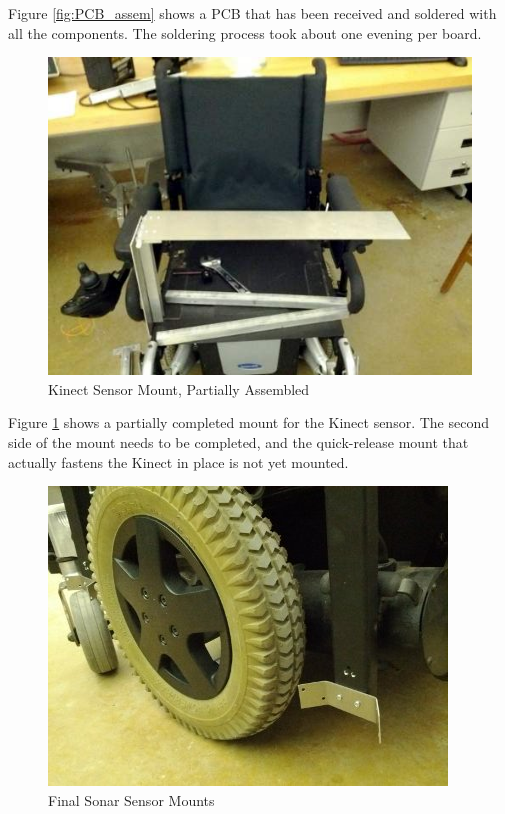 \documentclass[oneside,final,a4paper]{report}
\begin{document}
Figure \ref{fig:PCB_assem} shows a PCB that has been received and soldered with all the components. The soldering process took about one evening per board.

\begin{figure}[hbt]
 \centering
 \includegraphics[scale=0.35]{Kinect_Shelf}
 \caption{Kinect Sensor Mount, Partially Assembled}
 \label{fig:kinect_partial}
\end{figure}

Figure \ref{fig:kinect_partial} shows a partially completed mount for the Kinect sensor. The second side of the mount needs to be completed, and the quick-release mount that actually fastens the Kinect in place is not yet mounted.

\begin{figure}[hbt]
 \centering
 \includegraphics[scale=0.35]{Sensor_Mount_Final}
 \caption{Final Sonar Sensor Mounts}
 \label{fig:sonar_mount_final}
\end{figure}
\end{document}
